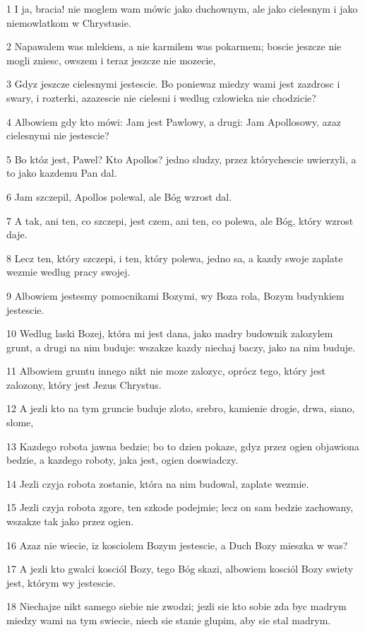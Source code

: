 \par 1 I ja, bracia! nie moglem wam mówic jako duchownym, ale jako cielesnym i jako niemowlatkom w Chrystusie.
\par 2 Napawalem was mlekiem, a nie karmilem was pokarmem; boscie jeszcze nie mogli zniesc, owszem i teraz jeszcze nie mozecie,
\par 3 Gdyz jeszcze cielesnymi jestescie. Bo poniewaz miedzy wami jest zazdrosc i swary, i rozterki, azazescie nie cielesni i wedlug czlowieka nie chodzicie?
\par 4 Albowiem gdy kto mówi: Jam jest Pawlowy, a drugi: Jam Apollosowy, azaz cielesnymi nie jestescie?
\par 5 Bo któz jest, Pawel? Kto Apollos? jedno sludzy, przez którychescie uwierzyli, a to jako kazdemu Pan dal.
\par 6 Jam szczepil, Apollos polewal, ale Bóg wzrost dal.
\par 7 A tak, ani ten, co szczepi, jest czem, ani ten, co polewa, ale Bóg, który wzrost daje.
\par 8 Lecz ten, który szczepi, i ten, który polewa, jedno sa, a kazdy swoje zaplate wezmie wedlug pracy swojej.
\par 9 Albowiem jestesmy pomocnikami Bozymi, wy Boza rola, Bozym budynkiem jestescie.
\par 10 Wedlug laski Bozej, która mi jest dana, jako madry budownik zalozylem grunt, a drugi na nim buduje: wszakze kazdy niechaj baczy, jako na nim buduje.
\par 11 Albowiem gruntu innego nikt nie moze zalozyc, oprócz tego, który jest zalozony, który jest Jezus Chrystus.
\par 12 A jezli kto na tym gruncie buduje zloto, srebro, kamienie drogie, drwa, siano, slome,
\par 13 Kazdego robota jawna bedzie; bo to dzien pokaze, gdyz przez ogien objawiona bedzie, a kazdego roboty, jaka jest, ogien doswiadczy.
\par 14 Jezli czyja robota zostanie, która na nim budowal, zaplate wezmie.
\par 15 Jezli czyja robota zgore, ten szkode podejmie; lecz on sam bedzie zachowany, wszakze tak jako przez ogien.
\par 16 Azaz nie wiecie, iz kosciolem Bozym jestescie, a Duch Bozy mieszka w was?
\par 17 A jezli kto gwalci kosciól Bozy, tego Bóg skazi, albowiem kosciól Bozy swiety jest, którym wy jestescie.
\par 18 Niechajze nikt samego siebie nie zwodzi; jezli sie kto sobie zda byc madrym miedzy wami na tym swiecie, niech sie stanie glupim, aby sie stal madrym.
